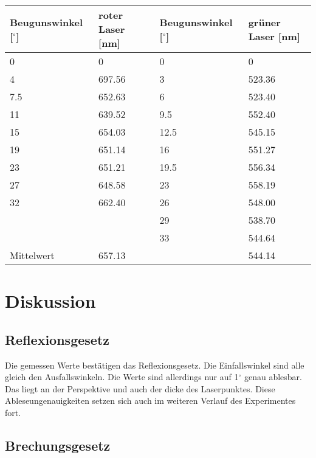 \begin{minipage}{\linewidth}
    \begin{table}[H]
        \centering
    \begin{tabular}{llll}
        \toprule
        Beugunswinkel [$^\circ$] & roter Laser [nm] & Beugunswinkel [$^\circ$] & grüner Laser [nm]  \\
        \midrule
        0   & 0    & 0     & 0    \\
        4 & 697.56 & 3 & 523.36 \\
        7.5 & 652.63 & 6 & 523.40\\
        11  & 639.52 & 9.5 & 552.40 \\
        15 & 654.03 & 12.5 & 545.15 \\
        19 & 651.14 & 16 & 551.27\\
        23  & 651.21  & 19.5  & 556.34  \\
        27 & 648.58 & 23 & 558.19 \\
        32 & 662.40 & 26 & 548.00 \\
           &        & 29 & 538.70\\
           &        & 33 & 544.64 \\
        \midrule
        Mittelwert & 657.13 & & 544.14\\
        \bottomrule   
    \end{tabular}
    
    \label{tab:9}
\end{table}
\end{minipage}

\section{Diskussion}

\subsection{Reflexionsgesetz}

Die gemessen Werte bestätigen das Reflexionsgesetz. Die Einfallswinkel sind alle gleich den Ausfallswinkeln. Die Werte sind allerdings nur auf 1$^\circ$ genau ablesbar. Das liegt an der Perspektive und auch der dicke des Laserpunktes. Diese Ableseungenauigkeiten setzen sich auch im weiteren Verlauf des Experimentes fort.

\subsection{Brechungsgesetz}

